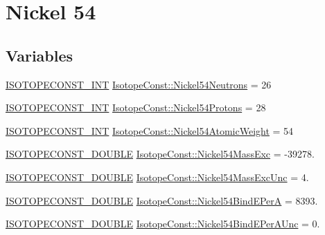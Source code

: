 \hypertarget{group___isotope_const-_nickel-_ni54}{}\section{Nickel 54}
\label{group___isotope_const-_nickel-_ni54}
\subsection*{Variables}
\begin{DoxyCompactItemize}
\item 
\mbox{\hyperlink{group___isotope_const-_macros_ga5f18360b3e99483a35c32d789e62621c}{I\+S\+O\+T\+O\+P\+E\+C\+O\+N\+S\+T\+\_\+\+I\+NT}} \mbox{\hyperlink{group___isotope_const-_nickel-_ni54_ga9455a61a53164e4e78be52b5c02dfa41}{Isotope\+Const\+::\+Nickel54\+Neutrons}} = 26
\item 
\mbox{\hyperlink{group___isotope_const-_macros_ga5f18360b3e99483a35c32d789e62621c}{I\+S\+O\+T\+O\+P\+E\+C\+O\+N\+S\+T\+\_\+\+I\+NT}} \mbox{\hyperlink{group___isotope_const-_nickel-_ni54_ga92e4b24164c981bb35394b06258f7754}{Isotope\+Const\+::\+Nickel54\+Protons}} = 28
\item 
\mbox{\hyperlink{group___isotope_const-_macros_ga5f18360b3e99483a35c32d789e62621c}{I\+S\+O\+T\+O\+P\+E\+C\+O\+N\+S\+T\+\_\+\+I\+NT}} \mbox{\hyperlink{group___isotope_const-_nickel-_ni54_gaccf6cd732e22414db41db65adcf8b1e7}{Isotope\+Const\+::\+Nickel54\+Atomic\+Weight}} = 54
\item 
\mbox{\hyperlink{group___isotope_const-_macros_ga8f45a7272ce02c0b4c65c44636ed719a}{I\+S\+O\+T\+O\+P\+E\+C\+O\+N\+S\+T\+\_\+\+D\+O\+U\+B\+LE}} \mbox{\hyperlink{group___isotope_const-_nickel-_ni54_ga11b82f9f2ead47c43ecfabaf4c46e4ed}{Isotope\+Const\+::\+Nickel54\+Mass\+Exc}} = -\/39278.
\item 
\mbox{\hyperlink{group___isotope_const-_macros_ga8f45a7272ce02c0b4c65c44636ed719a}{I\+S\+O\+T\+O\+P\+E\+C\+O\+N\+S\+T\+\_\+\+D\+O\+U\+B\+LE}} \mbox{\hyperlink{group___isotope_const-_nickel-_ni54_ga09406dd16135d220af0963dea8a23e73}{Isotope\+Const\+::\+Nickel54\+Mass\+Exc\+Unc}} = 4.
\item 
\mbox{\hyperlink{group___isotope_const-_macros_ga8f45a7272ce02c0b4c65c44636ed719a}{I\+S\+O\+T\+O\+P\+E\+C\+O\+N\+S\+T\+\_\+\+D\+O\+U\+B\+LE}} \mbox{\hyperlink{group___isotope_const-_nickel-_ni54_ga6b5dc4075c847e5a5560bda27e115cd6}{Isotope\+Const\+::\+Nickel54\+Bind\+E\+PerA}} = 8393.
\item 
\mbox{\hyperlink{group___isotope_const-_macros_ga8f45a7272ce02c0b4c65c44636ed719a}{I\+S\+O\+T\+O\+P\+E\+C\+O\+N\+S\+T\+\_\+\+D\+O\+U\+B\+LE}} \mbox{\hyperlink{group___isotope_const-_nickel-_ni54_gacae1e6fd1a72637ba3ff5af90217c832}{Isotope\+Const\+::\+Nickel54\+Bind\+E\+Per\+A\+Unc}} = 0.

\end{DoxyCompactItemize}
